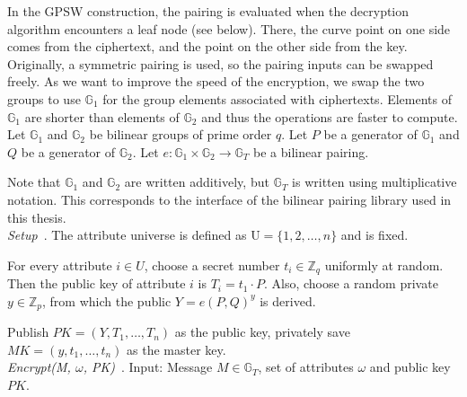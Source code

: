In the GPSW construction, the pairing is evaluated when the decryption algorithm encounters a leaf node (see below).
There, the curve point on one side comes from the ciphertext, and the point on the other side from the key.
Originally, a symmetric pairing is used, so the pairing inputs can be swapped freely.
As we want to improve the speed of the encryption, we swap the two groups to use $\mathbb{G}_1$ for the group elements associated with ciphertexts.
Elements of $\mathbb{G}_1$ are shorter than elements of $\mathbb{G}_2$ and thus the operations are faster to compute.
\\



Let $\mathbb{G}_1$ and $\mathbb{G}_2$ be bilinear groups of prime order $q$.
Let $P$ be a generator of $\mathbb{G}_1$ and $Q$ be a generator of $\mathbb{G}_2$.
Let $e: \mathbb{G}_1 \times \mathbb{G}_2 \rightarrow \mathbb{G}_T$ be a bilinear pairing.

Note that $\mathbb{G}_1$ and $\mathbb{G}_2$ are written additively, but $\mathbb{G}_T$ is written using multiplicative notation.
This corresponds to the interface of the bilinear pairing library used in this thesis.\\

\noindent \emph{Setup}~\cite{goyal_attribute-based_2006}.
The attribute universe is defined as $\text{U} = \{1, 2, \dots, n\}$ and is fixed.

For every attribute $i \in U$, choose a secret number $t_i \in \mathbb{Z}_q$ uniformly at random.
Then the public key of attribute $i$ is $T_i = t_1 \cdot P$.
Also, choose a random private $y \in \mathbb{Z}_p$, from which the public $Y = e(P, Q)^y$ is derived.

Publish $PK=(Y, T_1, \dots, T_n)$ as the public key, privately save $MK = (y, t_1, \dots, t_n)$ as the master key.
\\

\noindent \emph{Encrypt(M, $\omega$, PK)}~\cite{goyal_attribute-based_2006}.
Input: Message $M \in \mathbb{G}_T$, set of \glspl{attribute} $\omega$ and public key $PK$. 

